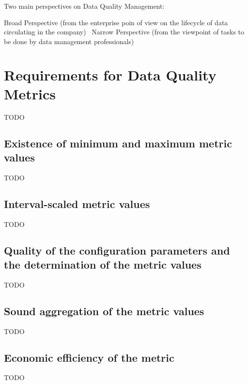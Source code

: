 Two main perspectives on Data Quality Management:

Broad Perspective (from the enterprise poin of view on the lifecycle of data circulating in the company)~\cite{book:dama}
Narrow Perspective (from the viewpoint of tasks to be done by data management professionals)~\cite{pres:dcam}

\section{Requirements for Data Quality Metrics}

TODO

\subsection{Existence of minimum and maximum metric values}

TODO

\subsection{Interval-scaled metric values}

TODO

\subsection{Quality of the configuration parameters and the determination of the metric values}

TODO

\subsection{Sound aggregation of the metric values}

TODO

\subsection{Economic efficiency of the metric}

TODO




